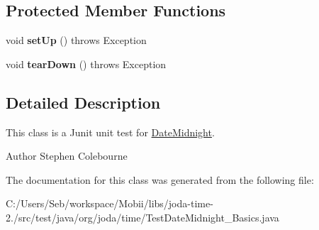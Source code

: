 \subsection*{Protected Member Functions}
\begin{DoxyCompactItemize}
\item 
\hypertarget{classorg_1_1joda_1_1time_1_1_test_date_midnight___basics_a326dbfff251377387f9107af41b1bc0a}{void {\bfseries set\-Up} ()  throws Exception }\label{classorg_1_1joda_1_1time_1_1_test_date_midnight___basics_a326dbfff251377387f9107af41b1bc0a}

\item 
\hypertarget{classorg_1_1joda_1_1time_1_1_test_date_midnight___basics_a030d890eccefa70caa643974b185fdfe}{void {\bfseries tear\-Down} ()  throws Exception }\label{classorg_1_1joda_1_1time_1_1_test_date_midnight___basics_a030d890eccefa70caa643974b185fdfe}

\end{DoxyCompactItemize}


\subsection{Detailed Description}
This class is a Junit unit test for \hyperlink{classorg_1_1joda_1_1time_1_1_date_midnight}{Date\-Midnight}.

\begin{DoxyAuthor}{Author}
Stephen Colebourne 
\end{DoxyAuthor}


The documentation for this class was generated from the following file\-:\begin{DoxyCompactItemize}
\item 
C\-:/\-Users/\-Seb/workspace/\-Mobii/libs/joda-\/time-\/2./src/test/java/org/joda/time/Test\-Date\-Midnight\-\_\-\-Basics.\-java\end{DoxyCompactItemize}
